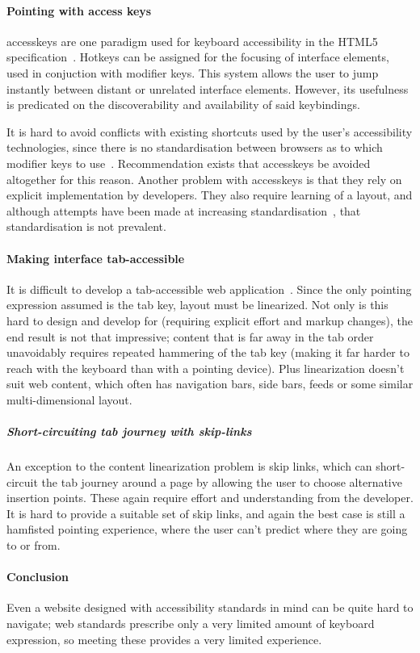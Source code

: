 \documentclass[a4paper, 12pt]{report}
\begin{document}
\paragraph{Pointing with access keys}
\label{accesskeysection}
  \Gls{accesskeys} are one paradigm used for keyboard accessibility in the HTML5 specification~\cite{html5specaccesskeys}. Hotkeys can be assigned for the focusing of interface elements, used in conjuction with modifier keys. This system allows the user to jump instantly between distant or unrelated interface elements. However, its usefulness is predicated on the discoverability and availability of said \glspl{keybinding}.

  It is hard to avoid conflicts with existing shortcuts used by the user's accessibility technologies, since there is no standardisation between browsers as to which modifier keys to use~\cite{webaimaccesskeys}. Recommendation exists that \gls{accesskeys} be avoided altogether for this reason. Another problem with \gls{accesskeys} is that they rely on explicit implementation by developers. They also require learning of a layout, and although attempts have been made at increasing standardisation~\cite{AccesskeyStandardisation}, that standardisation is not prevalent.
\paragraph{Making interface tab-accessible}
   It is difficult to develop a tab-accessible web application~\cite{watanabe2012using}. Since the only pointing expression assumed is the tab key, layout must be linearized. Not only is this hard to design and develop for (requiring explicit effort and markup changes), the end result is not that impressive; content that is far away in the tab order unavoidably requires repeated hammering of the tab key (making it far harder to reach with the keyboard than with a pointing device). Plus linearization doesn't suit web content, which often has navigation bars, side bars, feeds or some similar multi-dimensional layout.
\subparagraph{Short-circuiting tab journey with skip-links}
\label{sec:skiplinks}
  An exception to the content linearization problem is skip links, which can short-circuit the tab journey around a page by allowing the user to choose alternative insertion points. These again require effort and understanding from the developer. It is hard to provide a suitable set of skip links, and again the best case is still a hamfisted pointing experience, where the user can't predict where they are going to or from.
\paragraph{Conclusion}
  Even a website designed with accessibility standards in mind can be quite hard to navigate; web standards prescribe only a very limited amount of keyboard expression, so meeting these provides a very limited experience.
\end{document}
